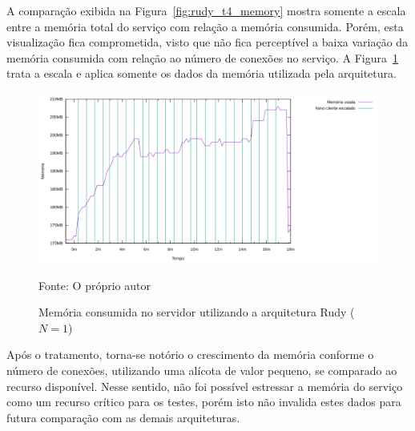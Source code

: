 A comparação exibida na Figura~\ref{fig:rudy_t4_memory} mostra somente a escala entre a memória total do serviço com relação a memória consumida.
%
Porém, esta visualização fica comprometida, visto que não fica perceptível a baixa variação da memória consumida com relação ao número de conexões no serviço.
%
A Figura~\ref{fig:rudy_t4_memory_used} trata a escala e aplica somente os dados da memória utilizada pela arquitetura.

\begin{figure}[htb!]
    \caption{Memória consumida no servidor utilizando a arquitetura Rudy ($N=1$)}
    \label{fig:rudy_t4_memory_used}
    \includegraphics[width=\textwidth]{metricas_rudy_t4/memory_used.png}
    \centering
    
    Fonte: O próprio autor
\end{figure}

Após o tratamento, torna-se notório o crescimento da memória conforme o número de conexões, utilizando uma alícota de valor pequeno, se comparado ao recurso disponível.
%
Nesse sentido, não foi possível estressar a memória do serviço como um recurso crítico para os testes, porém isto não invalida estes dados para futura comparação com as demais arquiteturas.

